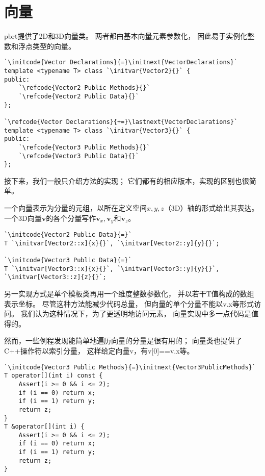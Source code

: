 \section{向量}\label{sec:向量}

pbrt提供了2D和3D向量类。
两者都由基本向量元素参数化，
因此易于实例化整数和浮点类型的向量。

\begin{lstlisting}
`\initcode{Vector Declarations}{=}\initnext{VectorDeclarations}`
template <typename T> class `\initvar{Vector2}{}` {
public:
    `\refcode{Vector2 Public Methods}{}`
    `\refcode{Vector2 Public Data}{}`
};

`\refcode{Vector Declarations}{+=}\lastnext{VectorDeclarations}`
template <typename T> class `\initvar{Vector3}{}` {
public:
    `\refcode{Vector3 Public Methods}{}`
    `\refcode{Vector3 Public Data}{}`
};
\end{lstlisting}

接下来，我们一般只介绍方法的实现；
它们都有的相应版本，实现的区别也很简单。

一个向量表示为分量的元组，以所在定义空间$x,y,z$（3D）轴的形式给出其表达。
一个3D向量$\bm v$的各个分量写作$\bm v_x,\bm v_y$和$\bm v_z$。

\begin{lstlisting}
`\initcode{Vector2 Public Data}{=}`
T `\initvar[Vector2::x]{x}{}`, `\initvar[Vector2::y]{y}{}`;

`\initcode{Vector3 Public Data}{=}`
T `\initvar[Vector3::x]{x}{}`, `\initvar[Vector3::y]{y}{}`, `\initvar[Vector3::z]{z}{}`;
\end{lstlisting}

另一实现方式是单个模板类再用一个维度整数参数化，
并以若干{\ttfamily T}值构成的数组表示坐标。
尽管这种方法能减少代码总量，
但向量的单个分量不能以{\ttfamily v.x}等形式访问。
我们认为这种情况下，为了更透明地访问元素，
向量实现中多一点代码是值得的。

然而，一些例程发现能简单地遍历向量的分量是很有用的；
向量类也提供了C++操作符以索引分量，
这样给定向量{\ttfamily v}，有{\ttfamily v[0]==v.x}等。
\begin{lstlisting}
`\initcode{Vector3 Public Methods}{=}\initnext{Vector3PublicMethods}`
T operator[](int i) const { 
    Assert(i >= 0 && i <= 2);
    if (i == 0) return x;
    if (i == 1) return y;
    return z;
}
T &operator[](int i) { 
    Assert(i >= 0 && i <= 2);
    if (i == 0) return x;
    if (i == 1) return y;
    return z;
}
\end{lstlisting}

